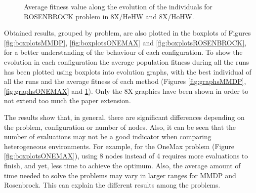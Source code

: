 \documentclass[final,1p,times]{elsarticle}
\begin{document}
\begin{figure}[htb]
\caption{Average fitness value along the evolution of the individuals for ROSENBROCK problem in 8X/HeHW and 8X/HoHW.}
\label{fig:graphsROSENBROCK}
\end{figure}



Obtained results, grouped by problem, are also plotted in the boxplots of Figures \ref{fig:boxplotsMMDP}, \ref{fig:boxplotsONEMAX} and \ref{fig:boxplotsROSENBROCK}, for a better understanding of the behaviour of each configuration. To show the evolution in each configuration the average population fitness during all the runs has been plotted using boxplots into evolution graphs, with the best individual of all the runs and the average fitness of each method (Figures \ref{fig:graphsMMDP}, \ref{fig:graphsONEMAX} and \ref{fig:graphsROSENBROCK}). 
Only the 8X graphics have been shown in order to not extend too much the paper extension. 

The results show that, in general, there are significant differences
depending on the problem, configuration or number of nodes. Also, it
can be seen that the number of evaluations may not be a good indicator
when comparing heterogeneous environments. For example, for the OneMax
problem (Figure \ref{fig:boxplotsONEMAX}), using 8 nodes instead of 4
requires more evaluations to finish, and yet, less time to achieve the
optimum.  
Also, the average amount of time needed to solve the problems may vary
in larger ranges for MMDP and Rosenbrock. This can explain the different results
among the problems.  
\end{document}
